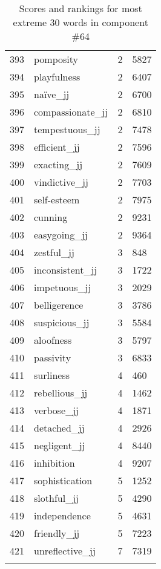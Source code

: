 \begin{longtable}[!htbp]{| rlr@{.}l |}
    393 & pomposity & 2 & 5827 \\
    394 & playfulness & 2 & 6407 \\
    395 & naïve\_jj & 2 & 6700 \\
    396 & compassionate\_jj & 2 & 6810 \\
    397 & tempestuous\_jj & 2 & 7478 \\
    398 & efficient\_jj & 2 & 7596 \\
    399 & exacting\_jj & 2 & 7609 \\
    400 & vindictive\_jj & 2 & 7703 \\
    401 & self-esteem & 2 & 7975 \\
    402 & cunning & 2 & 9231 \\
    403 & easygoing\_jj & 2 & 9364 \\
    404 & zestful\_jj & 3 & 848 \\
    405 & inconsistent\_jj & 3 & 1722 \\
    406 & impetuous\_jj & 3 & 2029 \\
    407 & belligerence & 3 & 3786 \\
    408 & suspicious\_jj & 3 & 5584 \\
    409 & aloofness & 3 & 5797 \\
    410 & passivity & 3 & 6833 \\
    411 & surliness & 4 & 460 \\
    412 & rebellious\_jj & 4 & 1462 \\
    413 & verbose\_jj & 4 & 1871 \\
    414 & detached\_jj & 4 & 2926 \\
    415 & negligent\_jj & 4 & 8440 \\
    416 & inhibition & 4 & 9207 \\
    417 & sophistication & 5 & 1252 \\
    418 & slothful\_jj & 5 & 4290 \\
    419 & independence & 5 & 4631 \\
    420 & friendly\_jj & 5 & 7223 \\
    421 & unreflective\_jj & 7 & 7319 \\
    \hline
    \caption{Scores and rankings for most extreme 30 words in component \#64} \\
\end{longtable}
